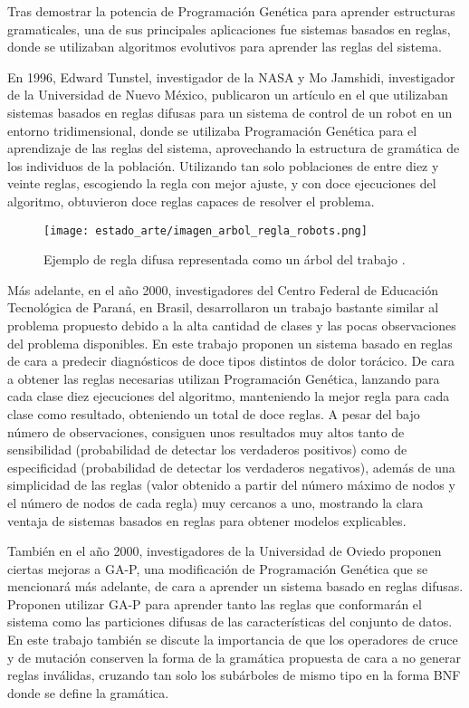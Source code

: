 Tras demostrar la potencia de Programación Genética para aprender estructuras gramaticales, una de sus principales aplicaciones fue sistemas basados en reglas, donde se utilizaban algoritmos evolutivos para aprender las reglas del sistema.

En 1996, Edward Tunstel, investigador de la NASA y Mo Jamshidi, investigador de la Universidad de Nuevo México, publicaron un artículo \cite{PGcontrolRobots} en el que utilizaban sistemas basados en reglas difusas para un sistema de control de un robot en un entorno tridimensional, donde se utilizaba Programación Genética para el aprendizaje de las reglas del sistema, aprovechando la estructura de gramática de los individuos de la población. Utilizando tan solo poblaciones de entre diez y veinte reglas, escogiendo la regla con mejor ajuste, y con doce ejecuciones del algoritmo, obtuvieron doce reglas capaces de resolver el problema.

\begin{figure}[H]
	\centering
	\texttt{[image: estado\_arte/imagen\_arbol\_regla\_robots.png]}
	\caption{Ejemplo de regla difusa representada como un árbol del trabajo \cite{PGcontrolRobots}.}
	\label{fig:imagen_arbol_regla_robots}
\end{figure}

Más adelante, en el año 2000, investigadores del Centro Federal de Educación Tecnológica de Paraná, en Brasil, desarrollaron un trabajo \cite{trabajoChestPain} bastante similar al problema propuesto debido a la alta cantidad de clases y las pocas observaciones del problema disponibles. En este trabajo proponen un sistema basado en reglas de cara a predecir diagnósticos de doce tipos distintos de dolor torácico. De cara a obtener las reglas necesarias utilizan Programación Genética, lanzando para cada clase diez ejecuciones del algoritmo, manteniendo la mejor regla para cada clase como resultado, obteniendo un total de doce reglas. A pesar del bajo número de observaciones, consiguen unos resultados muy altos tanto de sensibilidad (probabilidad de detectar los verdaderos positivos) como de especificidad (probabilidad de detectar los verdaderos negativos), además de una simplicidad de las reglas (valor obtenido a partir del número máximo de nodos y el número de nodos de cada regla) muy cercanos a uno, mostrando la clara ventaja de sistemas basados en reglas para obtener modelos explicables.

También en el año 2000, investigadores de la Universidad de Oviedo proponen \cite{GAPnichosFuzzyRules} ciertas mejoras a GA-P, una modificación de Programación Genética que se mencionará más adelante, de cara a aprender un sistema basado en reglas difusas. Proponen utilizar GA-P para aprender tanto las reglas que conformarán el sistema como las particiones difusas de las características del conjunto de datos. En este trabajo también se discute la importancia de que los operadores de cruce y de mutación conserven la forma de la gramática propuesta de cara a no generar reglas inválidas, cruzando tan solo los subárboles de mismo tipo en la forma BNF donde se define la gramática.

